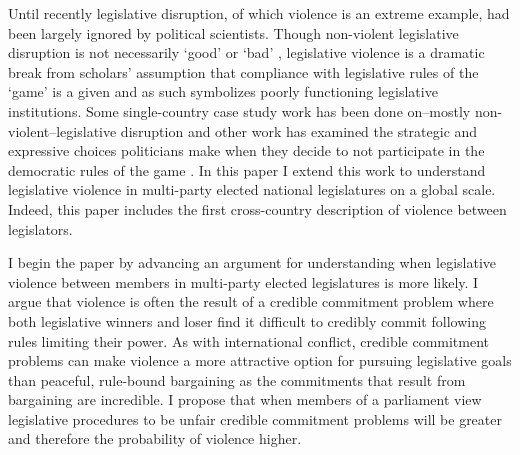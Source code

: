 \documentclass[a4paper]{article}\usepackage[]{graphicx}\usepackage[]{color}
\begin{document}
Until recently legislative disruption, of which violence is an extreme example, had been largely ignored by political scientists. Though non-violent legislative disruption is not necessarily `good' or `bad' \citep[see][for discussions of how nonviolent disruption may act as a  `safety valve']{Ostrow1996,Young2002}, legislative violence is a dramatic break from scholars' assumption that compliance with legislative rules of the `game' is a given \citep{Wolfe2004} and as such symbolizes poorly functioning legislative institutions. Some single-country case study work has been done on--mostly non-violent--legislative disruption \cite[see][]{Armitage2013,Johnson2013,Ilie2013,Wolfe2004} and other work has examined the strategic and expressive choices politicians make when they decide to not participate in the democratic rules of the game \citep[e.g.][]{wilkinson2006,Beaulieu2008,Spary2013}. In this paper I extend this work to understand legislative violence in multi-party elected national legislatures on a global scale. Indeed, this paper includes the first cross-country description of violence between legislators. 

I begin the paper by advancing an argument for understanding when legislative violence between members in multi-party elected legislatures is more likely. I argue that violence is often the result of a credible commitment problem where both legislative winners and loser find it difficult to credibly commit following rules limiting their power. As with international conflict, credible commitment problems can make violence a more attractive option for pursuing legislative goals than peaceful, rule-bound bargaining as the commitments that result from bargaining are incredible. I propose that when members of a parliament view legislative procedures to be unfair credible commitment problems will be greater and therefore the probability of violence higher. 
\end{document}
